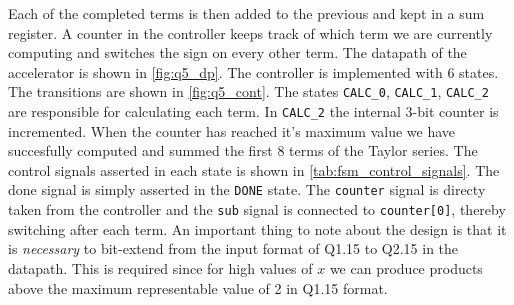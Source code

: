 \documentclass[../main.tex]{subfiles}
\begin{document}
Each of the completed terms is then added to the previous and kept in a sum register. A counter in the controller keeps track of which term we are currently computing and switches the sign on every other term. The datapath of the accelerator is shown in \cref{fig:q5_dp}. The controller is implemented with 6 states. The transitions are shown in \cref{fig:q5_cont}. The states \lstinline{CALC_0}, \lstinline{CALC_1}, \lstinline{CALC_2} are responsible for calculating each term. In \lstinline{CALC_2} the internal 3-bit counter is incremented. When the counter has reached it's maximum value we have succesfully computed and summed the first 8 terms of the Taylor series. The control signals asserted in each state is shown in \cref{tab:fsm_control_signals}. The done signal is simply asserted in the \lstinline{DONE} state. The \lstinline{counter} signal is directy taken from the controller and the \lstinline{sub} signal is connected to \lstinline{counter[0]}, thereby switching after each term. An important thing to note about the design is that it is \textit{necessary} to bit-extend from the input format of Q1.15 to Q2.15 in the datapath. This is required since for high values of $x$ we can produce products above the maximum representable value of 2 in Q1.15 format.
\end{document}
